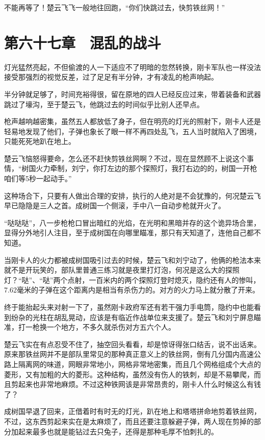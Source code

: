 不能再等了！楚云飞飞一般地往回跑，“你们快跳过去，快剪铁丝网！”

\section{第六十七章　混乱的战斗}

灯光猛然亮起，不但偷渡的人一下适应不了明暗的忽然转换，刚卡军队也一样没法接受那强烈的视觉反差，过了足足有半分钟，才有凌乱的枪声响起。

半分钟就足够了，时间充裕得很，留在原地的四人已经反应过来，带着装备和武器跳过了壕沟，至于楚云飞，他跳过去的时间似乎比别人还早点。

枪声越响越密集，虽然五人都放低了身子，但在明亮的灯光的照射下，刚卡人还是轻易地发现了他们，子弹也象长了眼一样不再四处乱飞，五人当时就陷入了困境，只能死死地趴在地上。

楚云飞恼怒得要命，怎么还不赶快剪铁丝网啊？不过，现在显然顾不上说这个事情，“树国火力牵制，刘宁，你打左边的那个探照灯，我打右边的的，树国一开枪咱们等5秒一起动手。”

这种场合下，只要有人做出合理的安排，执行的人绝对是不会犹豫的，何况楚云飞早已隐隐是三人之首。成树国一个侧滚，手中八一自动步枪就开火了。

“哒哒哒”，八一步枪枪口冒出暗红的光焰，在光明和黑暗并存的这个诡异场合里，显得分外地引人注目，至于成树国在向哪里瞄准，那只有天知道了，连他自己都不知道。

当刚卡人的火力都被成树国吸引过去的时候，楚云飞和刘宁动了，他俩的枪法本来就不是开玩笑的，部队里普通三练习就是夜里打灯泡，何况是这么大的探照灯？“哒”、“哒”两个点射，一百米内的两个探照灯登时熄灭，隐约还有人的惨叫，7.62毫米的子弹在这个距离内是相当有杀伤力的。对方的火力马上就分散了开来。

终于能抬起头来对射一下了，虽然刚卡政府军还有若干强力手电筒，隐约中也能看到纷杂的光柱在胡乱晃动，应该是有临近作战单位来支援了。楚云飞和刘宁屏息瞄准，打一枪换一个地方，不多久就杀伤对方五六个人。

楚云飞实在有点忍受不住了，抽空回头看看，却是惊讶得张口结舌，说不出话来。原来那铁丝网并不是部队里常见的那种真正意义上的铁丝网，倒有几分国内高速公路上隔离网的味道，网眼非常地小，网格非常地密集，而且几个网格组成个大点的菱形，又有加粗的大的菱形。这种结构，虽然没有伤人的铁刺，却是不易攀爬，而且剪起来也非常地麻烦。不过这种铁网该是非常昂贵的，刚卡人什么时候这么有钱了？

成树国早退了回来，正借着时有时无的灯光，趴在地上和塔塔拼命地剪着铁丝网，不过，这东西剪起来实在是太麻烦了，而且还要注意躲避子弹，两人现在剪掉的部分加起来最多也就是能钻过去只兔子，还得是那种毛厚不怕刺扎的。

